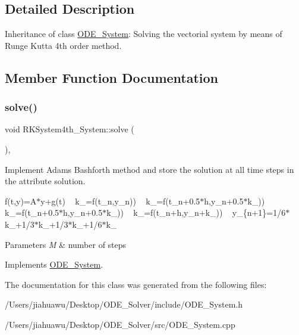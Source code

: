 \subsection{Detailed Description}
Inheritance of class \mbox{\hyperlink{class_o_d_e___system}{O\+D\+E\+\_\+\+System}}\+: Solving the vectorial system by means of Runge Kutta 4th order method. 

\subsection{Member Function Documentation}
\mbox{\label{class_r_k_system4th___system_ae7e9125546c6590f50d581f5e6668c82}} 
\subsubsection{\texorpdfstring{solve()}{solve()}}
{\footnotesize\ttfamily void R\+K\+System4th\+\_\+\+System\+::solve (\begin{DoxyParamCaption}{ }\end{DoxyParamCaption})\hspace{0.3cm}{\ttfamily [override]}, {\ttfamily [virtual]}}



Implement Adams Bashforth method and store the solution at all time steps in the attribute solution. 

f(t,y)=A$\ast$y+g(t) ~\newline
k\+\_=f(t\+\_\+n,y\+\_\+n)) ~\newline
k\+\_=f(t\+\_\+n+0.5$\ast$h,y\+\_\+n+0.5$\ast$k\+\_)) ~\newline
k\+\_=f(t\+\_\+n+0.5$\ast$h,y\+\_\+n+0.5$\ast$k\+\_)) ~\newline
k\+\_=f(t\+\_\+n+h,y\+\_\+n+k\+\_)) ~\newline
y\+\_\+\{n+1\}=1/6$\ast$k\+\_+1/3$\ast$k\+\_+1/3$\ast$k\+\_+1/6$\ast$k\+\_ ~\newline

\begin{DoxyParams}{Parameters}
{\em M} & number of steps \\
\hline
\end{DoxyParams}


Implements \mbox{\hyperlink{class_o_d_e___system_a78a058382148b745fa458f0b9f52f47c}{O\+D\+E\+\_\+\+System}}.



The documentation for this class was generated from the following files\+:\begin{DoxyCompactItemize}
\item 
/\+Users/jiahuawu/\+Desktop/\+O\+D\+E\+\_\+\+Solver/include/O\+D\+E\+\_\+\+System.\+h\item 
/\+Users/jiahuawu/\+Desktop/\+O\+D\+E\+\_\+\+Solver/src/O\+D\+E\+\_\+\+System.\+cpp\end{DoxyCompactItemize}
